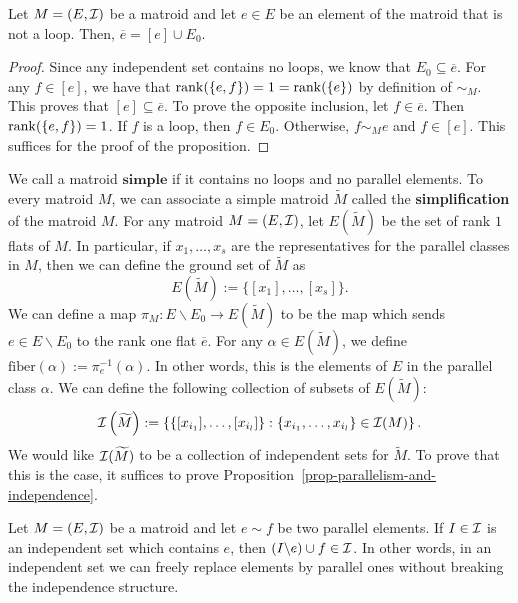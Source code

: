 \documentclass{puthesis-UG}
\begin{document}
\begin{prop} \label{characterization-of-atoms-of-flats}
	Let $M = (E, \mathcal{I})$ be a matroid and let $e \in E$ be an element of the matroid that is not a loop. Then, $\overline{e} = [e] \cup E_0$.
\end{prop}

\begin{proof}
	Since any independent set contains no loops, we know that $E_0 \subseteq \overline{e}$. For any $f \in [e]$, we have that $\operatorname{rank} (\{e, f\}) = 1 = \operatorname{rank} (\{e\})$ by definition of $\sim_M$. This proves that $[e] \subseteq \overline{e}$. To prove the opposite inclusion, let $f \in \overline{e}$. Then $\operatorname{rank}(\{e, f\}) = 1$. If $f$ is a loop, then $f \in E_0$. Otherwise, $f \sim_M e$ and $f \in [e]$. This suffices for the proof of the proposition. 
\end{proof}

We call a matroid $\textbf{simple}$ if it contains no loops and no parallel elements. To every matroid $M$, we can associate a simple matroid $\widetilde{M}$ called the \textbf{simplification} of the matroid $M$. For any matroid $M = (E, \mathcal{I})$, let $E(\widetilde{M})$ be the set of rank $1$ flats of $M$. In particular, if $x_1, \ldots, x_s$ are the representatives for the parallel classes in $M$, then we can define the ground set of $\widetilde{M}$ as 
\[
	E \left ( \widetilde{M} \right ) := \{[x_1], \ldots, [x_s]\}.	
\] 
We can define a map $\pi_M : E \backslash E_0 \to E(\widetilde{M})$ to be the map which sends $e \in E \backslash E_0$ to the rank one flat $\overline{e}$. For any $\alpha \in E(\widetilde{M})$, we define $\text{fiber}(\alpha) := \pi_e^{-1}(\alpha)$. In other words, this is the elements of $E$ in the parallel class $\alpha$. We can define the following collection of subsets of $E(\widetilde{M})$:
\[
	\mathcal{I} \left ( \widetilde{M} \right ) := \left \{ \{[x_{i_1}], \ldots, [x_{i_l}] \} : \{x_{i_1}, \ldots, x_{i_l}\} \in \mathcal{I}(M) \right \}.
\]
We would like $\mathcal{I}(\widetilde{M})$ to be a collection of independent sets for $\widetilde{M}$. To prove that this is the case, it suffices to prove Proposition~\ref{prop-parallelism-and-independence}. 

\begin{prop} \label{prop-parallelism-and-independence}
	Let $M = (E, \mathcal{I})$ be a matroid and let $e \sim f$ be two parallel elements. If $I \in \mathcal{I}$ is an independent set which contains $e$, then $(I \backslash e) \cup f \in \mathcal{I}$. In other words, in an independent set we can freely replace elements by parallel ones without breaking the independence structure. 
\end{prop}
\end{document}
